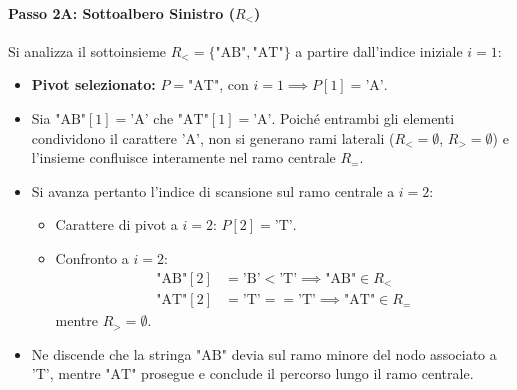 \paragraph{Passo 2A: Sottoalbero Sinistro ($R_{<}$)}
Si analizza il sottoinsieme $R_{<} = \{\text{"AB"}, \text{"AT"}\}$ a partire dall'indice iniziale $i = 1$:
\begin{itemize}
  \item \textbf{Pivot selezionato:} $P = \text{"AT"}$, con $i = 1 \implies P[1] = \text{'A'}$.
  \item Sia $\text{"AB"}[1] = \text{'A'}$ che $\text{"AT"}[1] = \text{'A'}$. Poich\'e entrambi gli elementi condividono il carattere $\text{'A'}$, non si generano rami laterali ($R_{<} = \emptyset$, $R_{>} = \emptyset$) e l'insieme confluisce interamente nel ramo centrale $R_{=}$.
  \item Si avanza pertanto l'indice di scansione sul ramo centrale a \textbf{$i = 2$}:
  \begin{itemize}
    \item Carattere di pivot a $i = 2$: $P[2] = \text{'T'}$.
    \item Confronto a $i = 2$:
    \begin{align}
      \text{"AB"}[2] &= \text{'B'} < \text{'T'} \implies \text{"AB"} \in R_{<} \\
      \text{"AT"}[2] &= \text{'T'} == \text{'T'} \implies \text{"AT"} \in R_{=}
    \end{align}
    mentre $R_{>} = \emptyset$.
  \end{itemize}
  \item Ne discende che la stringa $\text{"AB"}$ devia sul ramo minore del nodo associato a $\text{'T'}$, mentre $\text{"AT"}$ prosegue e conclude il percorso lungo il ramo centrale.
\end{itemize}

